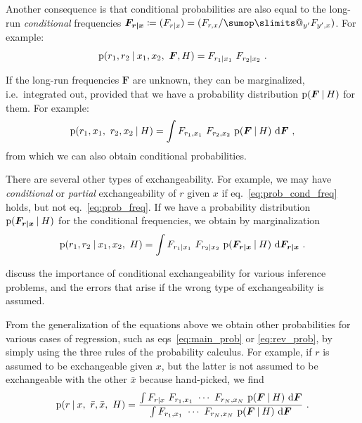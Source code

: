 \documentclass[\ifafour a4paper,12pt,\else a5paper,10pt,\fi%
onecolumn,oneside,article,%
british%
]{memoir}
\makeatletter
\theoremstyle{remark}
\theoremstyle{innote}
\def\sum{\DOTSI\sumop\slimits@}
\newcommand*{\di}{\mathrm{d}}%
\newcommand*{\defd}{\coloneqq}
\newcommand*{\p}{\mathrm{p}}%
\renewcommand*{\|}[1][]{\nonscript\:#1\vert\nonscript\:\mathopen{}}
\renewcommand*{\=}{\TextOrMath\texteq\eq}
\newcommand*{\eqn}{eq.}%
\newcommand*{\eqns}{eqs}%
\newcommand*{\ie}{{i.e.}}
\newcommand*{\ro}{r}
\newcommand*{\xo}{x}
\newcommand*{\rd}{\bar{r}}
\newcommand*{\xd}{\bar{x}}
\newcommand*{\yF}{\bm{F}}
\newcommand*{\yFrx}{\yF_{\bm{r\mid x}}}
\makeatother
\begin{document}
Another consequence is that conditional probabilities are also equal to the
long-run \emph{conditional} frequencies $\yFrx \defd (F_{r \|x}) =
(F_{r,x}/\sum_{y'}F_{y',x})$. For example:
\begin{equation}
  \label{eq:prob_cond_freq}
  \p(r_{1}, r_{2}\| x_{1}, x_{2},\ \yF, H) = F_{r_{1}\|x_{1}} \
  F_{r_{2}\|x_{2}} \ .
\end{equation}

If the long-run frequencies $\yF$ are unknown, they can be marginalized,
\ie\ integrated out, provided that we have a probability distribution
$\p(\yF \| H)$ for them. For example:
\begin{equation}
  \label{eq:prob_freq_integr}
  \p(r_{1},x_{1},\ r_{2},x_{2}\| H) = \int F_{r_{1},x_{1}} \
  F_{r_{2},x_{2}} \ \p(\yF \| H)\ \di\yF \ ,
\end{equation}
from which we can also obtain conditional probabilities.

There are several other types of exchangeability. For example, we may have
\emph{conditional} or \emph{partial} exchangeability of $r$ given $x$ if
\eqn~\eqref{eq:prob_cond_freq} holds, but not \eqn~\eqref{eq:prob_freq}. If
we have a probability distribution $\p(\yFrx \| H)$ for the conditional
frequencies, we obtain by marginalization
\begin{equation}
  \label{eq:prob_cond_freq_integr}
  \p(r_{1}, r_{2}\| x_{1}, x_{2},\ H) = \int F_{r_{1}\|x_{1}} \
  F_{r_{2}\|x_{2}}\ \p(\yFrx \| H)\ \di\yFrx \ .
\end{equation}

\textcite{lindleyetal1981} discuss the importance of conditional
exchangeability for various inference problems, and the errors that arise
if the wrong type of exchangeability is assumed.

From the generalization of the equations above we obtain other
probabilities for various cases of regression, such as
\eqns~\eqref{eq:main_prob} or \eqref{eq:rev_prob}, by simply using the
three rules of the probability calculus. For example, if $\ro$ is assumed
to be exchangeable given $\xo$, but the latter is not assumed to be
exchangeable with the other $\xd$ because hand-picked, we find
\begin{equation}
  \label{eq:main_prob_exch}
  \p(\ro \| \xo,\ \rd,\xd,\ H) =
  \frac{
    \int F_{\ro\|\xo} \ F_{r_{1},x_{1}} \  \dotsm \
  F_{r_{N},x_{N}} \ \p(\yF \| H)\ \di\yF
  }{
    \int F_{r_{1},x_{1}} \  \dotsm \
  F_{r_{N},x_{N}} \ \p(\yF \| H)\ \di\yF
  } \ .
\end{equation}
\end{document}
